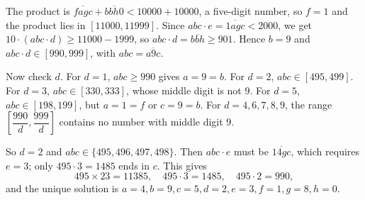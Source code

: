 The product is $\overline{fagc}+\overline{bbh0}<10000+10000$, a five-digit number, so $f=1$ and the product lies in $[11000,11999]$. Since $abc\cdot e=\overline{1agc}<2000$, we get $10\cdot(abc\cdot d)\ge11000-1999$, so $abc\cdot d=\overline{bbh}\ge901$. Hence $b=9$ and $abc\cdot d\in[990,999]$, with $abc=\overline{a9c}$.

Now check $d$. For $d=1$, $abc\ge990$ gives $a=9=b$. For $d=2$, $abc\in[495,499]$. For $d=3$, $abc\in[330,333]$, whose middle digit is not $9$. For $d=5$, $abc\in[198,199]$, but $a=1=f$ or $c=9=b$. For $d=4,6,7,8,9$, the range $\left[\dfrac{990}d,\dfrac{999}d\right]$ contains no number with middle digit $9$.

So $d=2$ and $abc\in\{495,496,497,498\}$. Then $abc\cdot e$ must be $\overline{14gc}$, which requires $e=3$; only $495\cdot3=1485$ ends in $c$. This gives
\[495\times23=11385,\quad 495\cdot3=1485,\quad 495\cdot2=990,\]
and the unique solution is $\boxed{a=4,b=9,c=5,d=2,e=3,f=1,g=8,h=0}$.

